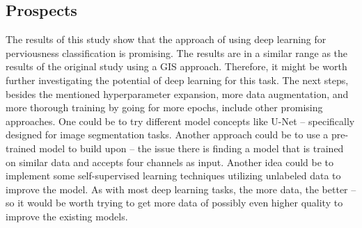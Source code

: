 \subsection{Prospects}

The results of this study show that the approach of using deep learning for perviousness
classification is promising. The results are in a similar range as the results of the
original study using a GIS approach. Therefore, it might be worth further investigating
the potential of deep learning for this task. The next steps, besides the mentioned hyperparameter
expansion, more data augmentation, and more thorough training by going for more epochs, include other
promising approaches. One could be to try different model concepts like U-Net -- specifically
designed for image segmentation tasks. Another approach could be to use a pre-trained model
to build upon -- the issue there is finding a model that is trained on similar data and
accepts four channels as input. Another idea could be to implement some self-supervised
learning techniques utilizing unlabeled data to improve the model. As with most deep
learning tasks, the more data, the better -- so it would be worth trying to get more data
of possibly even higher quality to improve the existing models.
